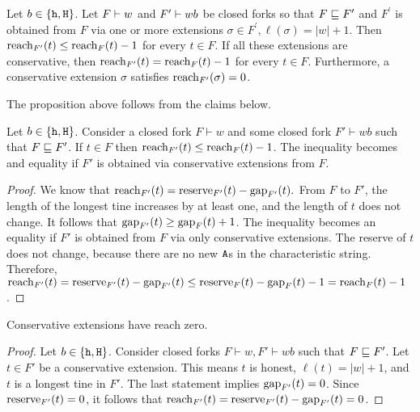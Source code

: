\begin{proposition}\label{prop:reach-fork-ext-mh}
  Let $b \in \{\mathtt{h}, \mathtt{H}\}$. 
  Let $F \vdash w$ and $F^\prime \vdash wb$ be closed forks so that 
  $F \sqsubseteq F^\prime$ and 
  $F^\prime$ is obtained from $F$ via one or more extensions 
  $\sigma \in F^\prime, \ell(\sigma) = |w| + 1$.
  Then $\operatorname{reach}_{F^\prime}(t) \leq \operatorname{reach}_F(t) - 1$ for every $t \in F$. 
  If all these extensions are conservative, then 
  $\operatorname{reach}_{F^\prime}(t) = \operatorname{reach}_F(t) - 1$ for every $t \in F$. 
  Furthermore, a conservative extension $\sigma$ satisfies 
  $\operatorname{reach}_{F^\prime}(\sigma) = 0$.
\end{proposition}
The proposition above follows from the claims below.
\begin{claim}\label{claim:nex-mh}
  Let $b \in \{\mathtt{h}, \mathtt{H}\}$. 
  Consider a closed fork $F\vdash w$ and some closed fork $F'\vdash wb$ such that $F\sqsubseteq F'$. 
  If $t \in F$ then 
  $\operatorname{reach}_{F'}(t)\leq \operatorname{reach}_{F}(t) - 1$. 
  The inequality becomes and equality 
  if $F'$ is obtained via 
  conservative extensions from $F$.
\end{claim}
\begin{proof}
  We know that $\operatorname{reach}_{F'}(t)=\operatorname{reserve}_{F'}(t)-\operatorname{gap}_{F'}(t).$ From $F$ to $F'$, the length of the longest tine increases by at least one, and the length of $t$ does not change. 
  It follows that $\operatorname{gap}_{F'}(t) \geq \operatorname{gap}_{F}(t) + 1$. 
  The inequality becomes an equality 
  if $F'$ is obtained from $F$ via only conservative extensions. 
  The reserve of $t$ does not change, because there are no new $\mathtt{A}$s in the characteristic string. Therefore, 
  $
    \operatorname{reach}_{F'}(t)
    =\operatorname{reserve}_{F'}(t)-\operatorname{gap}_{F'}(t)
    \leq \operatorname{reserve}_{F}(t)-\operatorname{gap}_{F}(t) - 1
    =\operatorname{reach}_{F}(t) - 1
  $. 
\end{proof}
\begin{claim}\label{claim:ex-mh}
  Conservative extensions have reach zero.
\end{claim}
\begin{proof}
  Let $b \in \{\mathtt{h}, \mathtt{H}\}$. 
  Consider closed forks $F\vdash w, F'\vdash wb$ 
  such that $F\sqsubseteq F'$. 
  Let $t \in F'$ be a conservative extension. 
  This means $t$ is honest, $\ell(t) = |w| + 1$, 
  and 
  $t$ is a longest tine in $F'$. 
  The last statement implies $\operatorname{gap}_{F'}(t)=0$. 
  Since $\operatorname{reserve}_{F'}(t)=0$, it follows that 
  $\operatorname{reach}_{F'}(t)=\operatorname{reserve}_{F'}(t)-\operatorname{gap}_{F'}(t) = 0$. 
\end{proof}


